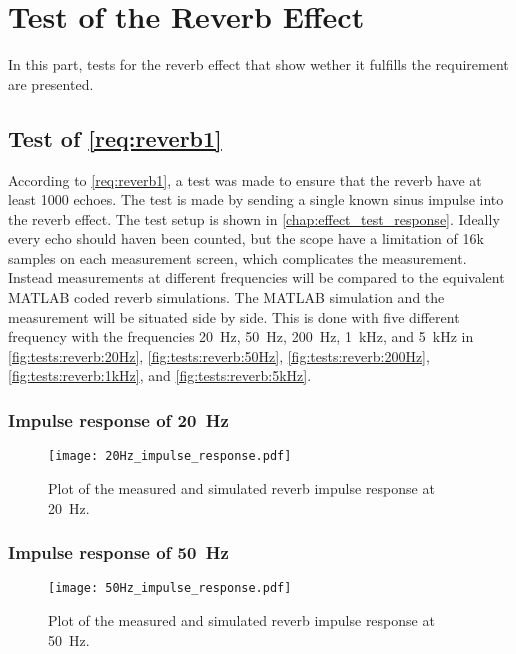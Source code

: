 \newpage
\section{Test of the Reverb Effect}
In this part, tests for the reverb effect that show wether it fulfills the requirement are presented. 


\subsection{Test of \autoref{req:reverb1}}
According to \autoref{req:reverb1}, a test was made to ensure that the \gls{reverb} have at least 1000 echoes. The test is made by sending a single known sinus impulse into the \gls{reverb} effect. The test setup is shown in \autoref{chap:effect_test_response}. Ideally every echo should haven been counted, but the scope have a limitation of 16k samples on each measurement screen, which complicates the measurement. Instead measurements at different frequencies will be compared to the equivalent MATLAB coded \gls{reverb} simulations. The MATLAB simulation and the measurement will be situated side by side. This is done with five different frequency with the frequencies \SI{20}{\hertz}, \SI{50}{\hertz}, \SI{200}{\hertz}, \SI{1}{\kilo\hertz}, and \SI{5}{\kilo\hertz} in \autoref{fig:tests:reverb:20Hz}, \autoref{fig:tests:reverb:50Hz}, \autoref{fig:tests:reverb:200Hz}, \autoref{fig:tests:reverb:1kHz}, and \autoref{fig:tests:reverb:5kHz}. 

\subsubsection*{Impulse response of \SI{20}{\hertz}}


\begin{figure}[htbp!]
    \centering
        \texttt{[image: 20Hz\_impulse\_response.pdf]}
        \caption{Plot of the measured and simulated \gls{reverb} impulse response at \SI{20}{\hertz}.}
        \label{fig:tests:reverb:20Hz}
  \end{figure}
  
  \newpage
  
\subsubsection*{Impulse response of \SI{50}{\hertz}}

\begin{figure}[htbp!]
    \centering
        \texttt{[image: 50Hz\_impulse\_response.pdf]}
        \caption{Plot of the measured and simulated \gls{reverb} impulse response at \SI{50}{\hertz}.}
        \label{fig:tests:reverb:50Hz}
  \end{figure}


